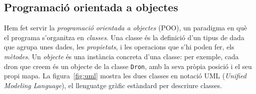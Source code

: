 \documentclass[11pt,a4paper]{article}
\begin{document}
\subsection{Programació orientada a objectes}

Hem fet servir la \emph{programació orientada a objectes} (POO), un paradigma en què el programa s'organitza en \emph{classes}. Una classe és la definició d'un tipus de dada que agrupa unes dades, les \emph{propietats}, i les operacions que s'hi poden fer, els \emph{mètodes}. Un \emph{objecte} és una instància concreta d'una classe: per exemple, cada dron que creem és un objecte de la classe \texttt{Dron}, amb la seva pròpia posició i el seu propi mapa. La figura~\ref{fig:uml} mostra les dues classes en notació UML (\emph{Unified Modeling Language}), el llenguatge gràfic estàndard per descriure classes.
\end{document}
